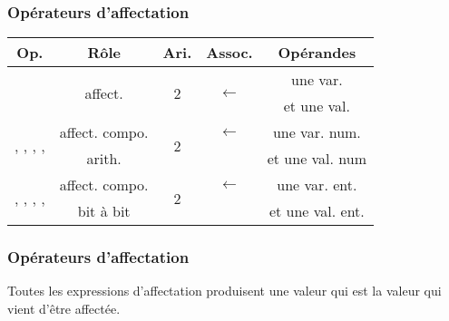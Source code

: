 \begin{frame}[fragile]
\frametitle{Opérateurs d'affectation}

\begin{center}
    \begin{tabular}{c|c|c|c|c}
        {\bf Op.} & {\bf Rôle} & {\bf Ari.} & {\bf Assoc.}
            & {\bf Opérandes} \\ \hline \hline
        \multirow{2}{*}{\Code{=}} & \multirow{2}{*}{affect.}
            & \multirow{2}{*}{2} & \multirow{2}{*}{$\longleftarrow$}
            & une var. \\
        & & & & et une val. \\ \hline
        \multirow{2}{*}{\Code{+=}, \Code{-=}, \Code{*=}, \Code{/=}, \Code{\%=}}
            & affect. compo.
            & \multirow{2}{*}{2} & $\longleftarrow$ & une var. num. \\
        & arith. & & & et une val. num \\ \hline
        \multirow{2}{*}{\Code{\&=}, \Code{|=}, \Code{\textasciicircum=},
        \Code{<\,<=}, \Code{>\,>=}}
        & affect. compo.
            & \multirow{2}{*}{2} & $\longleftarrow$ & une var. ent. \\
        & bit à bit & & & et une val. ent.
    \end{tabular}
\end{center}
\medskip

\end{frame}

\begin{frame}[fragile]
\frametitle{Opérateurs d'affectation}
Toutes les expressions d'affectation produisent une valeur qui est
la valeur qui vient d'être affectée.
\medskip

\begin{semiverbatim}\small{}
\end{semiverbatim}
\end{frame}

